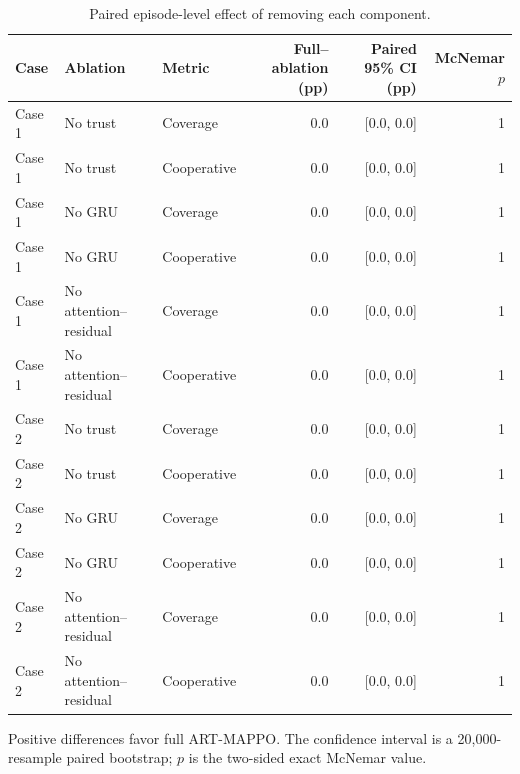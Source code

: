 \begin{table}[!t]
\centering
\small
\caption{Paired episode-level effect of removing each component.}
\label{tab:ablation_paired_effects}
\renewcommand{\arraystretch}{1.12}
\begin{tabular}{lllrrr}
\toprule
Case & Ablation & Metric & Full--ablation (pp) & Paired 95\% CI (pp) & McNemar $p$ \\
\midrule
Case 1 & No trust & Coverage & 0.0 & [0.0, 0.0] & 1 \\
Case 1 & No trust & Cooperative & 0.0 & [0.0, 0.0] & 1 \\
Case 1 & No GRU & Coverage & 0.0 & [0.0, 0.0] & 1 \\
Case 1 & No GRU & Cooperative & 0.0 & [0.0, 0.0] & 1 \\
Case 1 & No attention--residual & Coverage & 0.0 & [0.0, 0.0] & 1 \\
Case 1 & No attention--residual & Cooperative & 0.0 & [0.0, 0.0] & 1 \\
Case 2 & No trust & Coverage & 0.0 & [0.0, 0.0] & 1 \\
Case 2 & No trust & Cooperative & 0.0 & [0.0, 0.0] & 1 \\
Case 2 & No GRU & Coverage & 0.0 & [0.0, 0.0] & 1 \\
Case 2 & No GRU & Cooperative & 0.0 & [0.0, 0.0] & 1 \\
Case 2 & No attention--residual & Coverage & 0.0 & [0.0, 0.0] & 1 \\
Case 2 & No attention--residual & Cooperative & 0.0 & [0.0, 0.0] & 1 \\
\bottomrule
\end{tabular}
\vspace{1mm}\parbox{0.98\linewidth}{\footnotesize Positive differences favor full ART-MAPPO. The confidence interval is a 20,000-resample paired bootstrap; $p$ is the two-sided exact McNemar value.}
\end{table}
